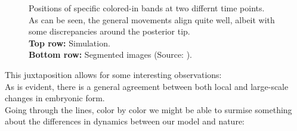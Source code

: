 \begin{figure}[H]
    \centering
\end{figure}
\begin{figure}[H]
    \centering
    \caption{Positions of specific colored-in bands at two differnt time points.\\ 
    As can be seen, the general movements align quite well, albeit with some discrepancies around the posterior tip.
    \\ \textbf{Top row:} Simulation.\\ \textbf{Bottom row:}  Segmented images (Source: ).}
    \label{fig:band-movements-stas}
\end{figure}

This juxtaposition allows for some interesting observations:\\
As is evident, there is a general agreement between both local and large-scale changes in embryonic form. \\

Going through the lines, color by color we might be able to surmise something about the differences in dynamics between our model and nature:

